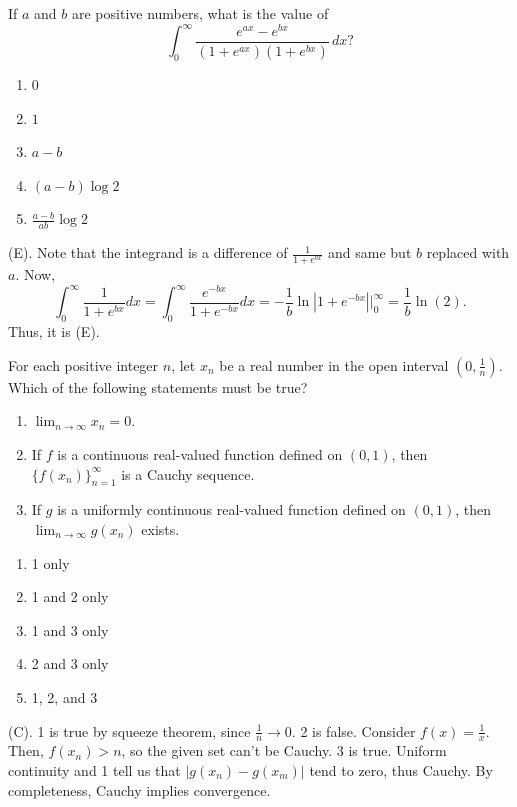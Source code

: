 \begin{exercise}
If $a$ and $b$ are positive numbers, what is the value of
\[
\int_0^\infty
\frac{e^{ax}-e^{bx}}
{(1+e^{ax})(1+e^{bx})}\,dx?
\]

\begin{enumerate}[label=(\Alph*)]
    \item $0$
    \item $1$
    \item $a-b$
    \item $(a-b)\log 2$
    \item $\displaystyle \frac{a-b}{ab}\log 2$
\end{enumerate}
\end{exercise}
\begin{solution}
(E). Note that the integrand is a difference of $\frac{1}{1 + e^{bx}}$ and same but 
$b$ replaced with $a$. Now,
\[
\int_0^{\infty} \frac{1}{1 + e^{bx}} dx 
= \int_0^{\infty} \frac{e^{-bx}}{1 + e^{-bx}} dx 
= -\frac{1}{b}\ln|1 + e^{-bx}| \Bigg|_0^{\infty}
= \frac{1}{b} \ln (2).
\]
Thus, it is (E).
\end{solution}

\begin{exercise}
For each positive integer $n$, let $x_n$ be a real number in the open interval
$\left(0,\frac{1}{n}\right)$. Which of the following statements must be true?

\begin{enumerate}
    \item $\lim_{n\to\infty} x_n=0$.
    \item If $f$ is a continuous real-valued function defined on $(0,1)$, then
    $\{f(x_n)\}_{n=1}^{\infty}$ is a Cauchy sequence.
    \item If $g$ is a uniformly continuous real-valued function defined on $(0,1)$, then 
    $\lim_{n\to\infty}g(x_n)$ exists.
\end{enumerate}
\begin{enumerate}[label=(\Alph*)]
    \item 1 only
    \item 1 and 2 only
    \item 1 and 3 only
    \item 2 and 3 only
    \item 1, 2, and 3
\end{enumerate}
\end{exercise}
\begin{solution}
(C). 1 is true by squeeze theorem, since $\frac{1}{n} \rightarrow 0$. 2 is false. 
Consider $f(x) = \frac{1}{x}$. Then, $f(x_n) > n$, so the given set can't be Cauchy.
3 is true. Uniform continuity and 1 tell us that $|g(x_n) - g(x_m)|$ tend to zero, thus Cauchy.
By completeness, Cauchy implies convergence.
\end{solution}


